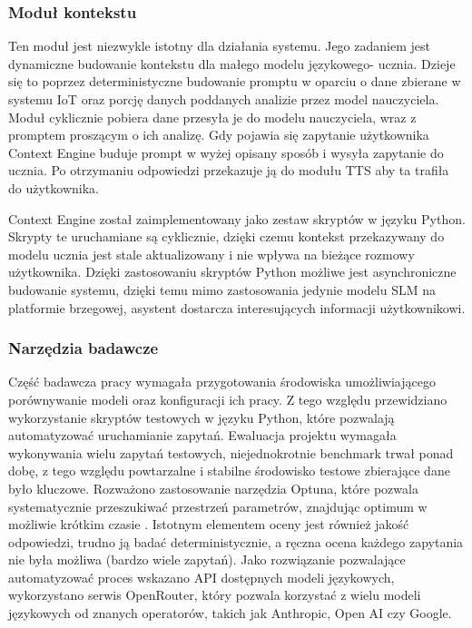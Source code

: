 \subsubsection{Moduł kontekstu}

Ten moduł jest niezwykle istotny dla działania systemu. Jego zadaniem jest dynamiczne budowanie kontekstu dla małego modelu językowego- ucznia. Dzieje się to poprzez deterministyczne budowanie promptu w oparciu o dane zbierane w systemu IoT oraz porcję danych poddanych analizie przez model nauczyciela. Moduł cyklicznie pobiera dane przesyła je do modelu nauczyciela, wraz z promptem proszącym o ich analizę. Gdy pojawia się zapytanie użytkownika Context Engine buduje prompt w wyżej opisany sposób i wysyła zapytanie do ucznia. Po otrzymaniu odpowiedzi przekazuje ją do modułu TTS aby ta trafiła do użytkownika.

Context Engine został zaimplementowany jako zestaw skryptów w języku Python. Skrypty te uruchamiane są cyklicznie, dzięki czemu kontekst przekazywany do modelu ucznia jest stale aktualizowany i nie wpływa na bieżące rozmowy użytkownika. Dzięki zastosowaniu skryptów Python możliwe jest asynchroniczne budowanie systemu, dzięki temu mimo zastosowania jedynie modelu SLM na platformie brzegowej, asystent dostarcza interesujących informacji użytkownikowi.

\subsubsection{Narzędzia badawcze}

Część badawcza pracy wymagała przygotowania środowiska umożliwiającego porównywanie modeli oraz konfiguracji ich pracy. Z tego względu przewidziano wykorzystanie skryptów testowych w języku Python, które pozwalają automatyzować uruchamianie zapytań. Ewaluacja projektu wymagała wykonywania wielu zapytań testowych, niejednokrotnie benchmark trwał ponad dobę, z tego względu powtarzalne i stabilne środowisko testowe zbierające dane było kluczowe. Rozważono zastosowanie narzędzia Optuna, które pozwala systematycznie przeszukiwać przestrzeń parametrów, znajdując optimum w możliwie krótkim czasie \cite{Akiba2019}. Istotnym elementem oceny jest również jakość odpowiedzi, trudno ją badać deterministycznie, a ręczna ocena każdego zapytania nie była możliwa (bardzo wiele zapytań). Jako rozwiązanie pozwalające automatyzować proces wskazano API dostępnych modeli językowych, wykorzystano serwis OpenRouter, który pozwala korzystać z wielu modeli językowych od znanych operatorów, takich jak Anthropic, Open AI czy Google.
